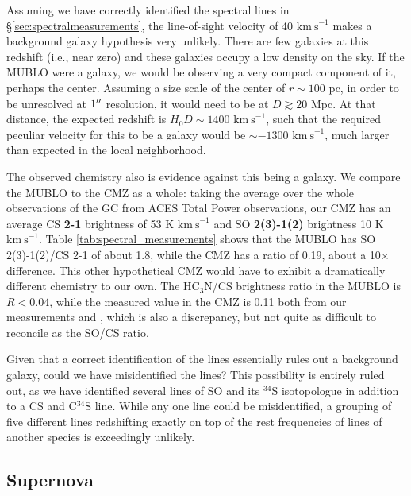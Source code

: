 \documentclass[]{aastex631}
\newcommand{\kms}{\ensuremath{\mathrm{km~s}^{-1}}\xspace}
\def\rr#1{\textbf{#1}}
\begin{document}
Assuming we have correctly identified the spectral lines in \S \ref{sec:spectralmeasurements}, the line-of-sight velocity of 40 \kms makes a background galaxy hypothesis very unlikely.
There are few galaxies at this redshift (i.e., near zero) and these galaxies occupy a low density on the sky.
If the MUBLO were a galaxy, we would be observing a very compact component of it, perhaps the center.
Assuming a size scale of the center of $r\sim100$ pc, in order to be unresolved at $1\mbox{$^{\prime\prime}$}$ resolution, it would need to be at $D\gtrsim20$ Mpc.
At that distance, the expected redshift is $H_0 D \sim 1400$ \kms, such that the required peculiar velocity for this to be a galaxy would be $\sim-1300$ \kms, much larger than expected in the local neighborhood.  

The observed chemistry also is evidence against this being a galaxy.
We compare the MUBLO to the CMZ as a whole: taking the average over the whole observations of the GC from ACES Total Power observations, our CMZ has an average CS \rr{2-1} brightness of 53 K \kms and SO \rr{2(3)-1(2)} brightness 10 K \kms.
Table \ref{tab:spectral_measurements} shows that the MUBLO has SO 2(3)-1(2)/CS 2-1 of about 1.8, while the CMZ has a ratio of 0.19, about a 10$\times$ difference.
This other hypothetical CMZ would have to exhibit a dramatically different chemistry to our own.  The HC$_3$N/CS brightness ratio in the MUBLO is $R<0.04$, while the measured value in the CMZ is 0.11 both from our measurements and  \citet{Jones2012}, which is also a discrepancy, but not quite as difficult to reconcile as the SO/CS ratio.

Given that a correct identification of the lines essentially rules out a background galaxy, could we have misidentified the lines?
This possibility is entirely ruled out, as we have identified several lines of SO and its $^{34}$S isotopologue in addition to a CS and C$^{34}$S line.
While any one line could be misidentified, a grouping of five different lines redshifting exactly on top of the rest frequencies of lines of another species is exceedingly unlikely.


\subsection{Supernova}
\end{document}

